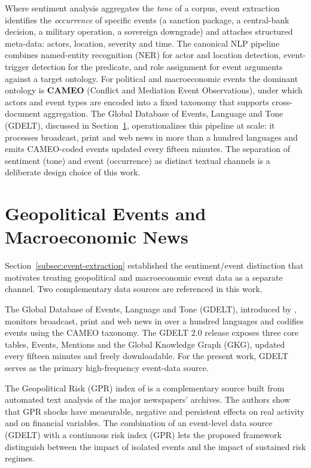 Where sentiment analysis aggregates the \textit{tone} of a corpus, event extraction identifies the \textit{occurrence} of specific events (a sanction package, a central-bank decision, a military operation, a sovereign downgrade) and attaches structured meta-data: actors, location, severity and time. The canonical NLP pipeline combines named-entity recognition (NER) for actor and location detection, event-trigger detection for the predicate, and role assignment for event arguments against a target ontology. For political and macroeconomic events the dominant ontology is \textbf{CAMEO} (Conflict and Mediation Event Observations), under which actors and event types are encoded into a fixed taxonomy that supports cross-document aggregation. The Global Database of Events, Language and Tone (GDELT), discussed in Section~\ref{sec:geopolitical}, operationalizes this pipeline at scale: it processes broadcast, print and web news in more than a hundred languages and emits CAMEO-coded events updated every fifteen minutes. The separation of sentiment (tone) and event (occurrence) as distinct textual channels is a deliberate design choice of this work.

\section{Geopolitical Events and Macroeconomic News} \label{sec:geopolitical}

Section~\ref{subsec:event-extraction} established the sentiment/event distinction that motivates treating geopolitical and macroeconomic event data as a separate channel. Two complementary data sources are referenced in this work.

The Global Database of Events, Language and Tone (GDELT), introduced by , monitors broadcast, print and web news in over a hundred languages and codifies events using the CAMEO taxonomy. The GDELT 2.0 release exposes three core tables, Events, Mentions and the Global Knowledge Graph (GKG), updated every fifteen minutes and freely downloadable. For the present work, GDELT serves as the primary high-frequency event-data source.

The Geopolitical Risk (GPR) index of  is a complementary source built from automated text analysis of the major newspapers' archives. The authors show that GPR shocks have measurable, negative and persistent effects on real activity and on financial variables. The combination of an event-level data source (GDELT) with a continuous risk index (GPR) lets the proposed framework distinguish between the impact of isolated events and the impact of sustained risk regimes.

